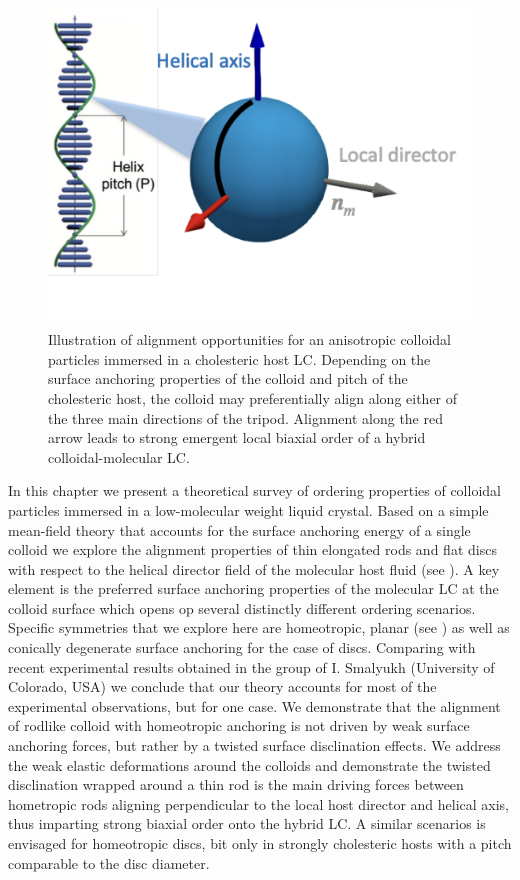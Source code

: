 \begin{figure}
	\includegraphics[width = 0.6 \columnwidth]{figures/chapter-3/tripod}
	\caption{ Illustration of alignment opportunities for an anisotropic colloidal particles immersed in a cholesteric host LC. Depending on the surface anchoring properties of the colloid  and pitch of the cholesteric host, the colloid may  preferentially  align along either of the three main directions of the tripod.   Alignment along the red arrow leads to strong emergent local biaxial order of a hybrid colloidal-molecular LC.  }
	\label{tripod}
\end{figure}



In this chapter we present a theoretical survey of ordering properties of colloidal particles immersed in a low-molecular weight liquid crystal. Based on a simple mean-field theory that accounts for the surface anchoring energy of a single colloid we explore the alignment properties of thin elongated rods and flat discs with respect to the helical director field of the molecular host fluid 
(see ).  A key element is the preferred surface anchoring  properties of the molecular LC at the colloid surface which opens op several distinctly different ordering scenarios. Specific symmetries  that we explore  here are homeotropic, planar (see ) as well as conically degenerate surface anchoring for the case of discs.   Comparing with recent experimental results obtained in the group of I. Smalyukh (University of  Colorado, USA) we conclude that our theory accounts for most of the experimental observations, but for one case. We demonstrate that the alignment of rodlike colloid with homeotropic anchoring is not  driven by weak surface anchoring forces, but rather by a twisted surface disclination effects.  We address the weak elastic deformations around the colloids and demonstrate the twisted disclination wrapped around a thin rod  is the main driving forces between hometropic rods aligning perpendicular to the local host director and helical axis, thus imparting strong biaxial order onto the hybrid LC. A similar scenarios is envisaged for homeotropic discs, bit only in strongly cholesteric hosts with a pitch comparable to the disc diameter.




